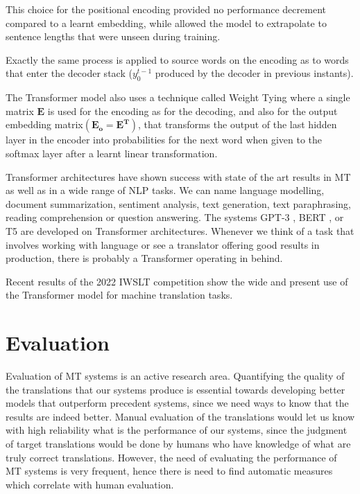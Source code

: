 \documentclass[11pt,english,listoffigures,listoftables]{tfgetsinf}
\newcommand{\vect}[1]{\mathbf{#1}}
\begin{document}
This choice for the positional encoding provided no performance decrement compared to a learnt embedding, while allowed the model to extrapolate to sentence lengths that were unseen during training.

Exactly the same process is applied to source words on the encoding as to words that enter the decoder stack ($y_0^{t-1}$ produced by the decoder in previous instants).

The Transformer model also uses a technique called Weight Tying \cite{press-wolf-2017-using}
where a single matrix $\vect{E}$ is used for the encoding as for the decoding, and also for the output embedding matrix$(\vect{E_o}=\vect{E^T})$, that transforms the output of the last hidden layer in the encoder into probabilities for the next word when given to the softmax layer after a learnt linear transformation.

Transformer architectures have shown success with state of the art results in MT as well as in a wide range of NLP tasks. We can name language modelling, document summarization, sentiment analysis, text generation, text paraphrasing, reading comprehension or question answering.
The systems GPT-3 \cite{https://doi.org/10.48550/arxiv.2005.14165}, BERT \cite{https://doi.org/10.48550/arxiv.1810.04805}, or T5 \cite{https://doi.org/10.48550/arxiv.1910.10683} are developed on Transformer architectures. Whenever we think of a task that involves working with language or see a translator offering good results in production, there is probably a Transformer operating in behind.

Recent results of the 2022 IWSLT competition \cite{anastasopoulos-etal-2022-findings} show the wide and present use of the Transformer model for machine translation tasks.

\section{Evaluation}

Evaluation of MT systems is an active research area. Quantifying the quality of the translations that our systems produce is essential towards developing better models that outperform precedent systems, since we need ways to know that the results are indeed better. Manual evaluation of the translations would let us know with high reliability what is the performance of our systems, since the judgment of target translations would be done by humans who have knowledge of what are truly correct translations. However, the need of evaluating the performance of MT systems is very frequent, hence there is need to find automatic measures which correlate with human evaluation. 
\end{document}
